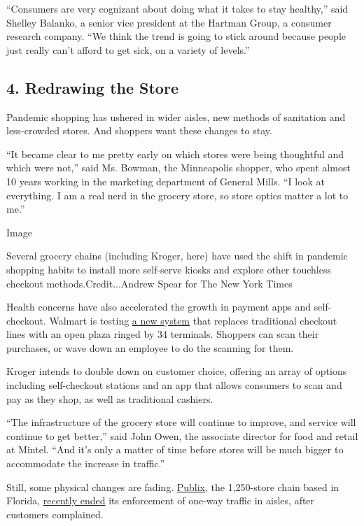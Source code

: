 ``Consumers are very cognizant about doing what it takes to stay
healthy,'' said Shelley Balanko, a senior vice president at the Hartman
Group, a consumer research company. ``We think the trend is going to
stick around because people just really can't afford to get sick, on a
variety of levels.''

\hypertarget{4-redrawing-the-store}{%
\subsection{4. Redrawing the Store}\label{4-redrawing-the-store}}

Pandemic shopping has ushered in wider aisles, new methods of sanitation
and less-crowded stores. And shoppers want these changes to stay.

``It became clear to me pretty early on which stores were being
thoughtful and which were not,'' said Ms. Bowman, the Minneapolis
shopper, who spent almost 10 years working in the marketing department
of General Mills. ``I look at everything. I am a real nerd in the
grocery store, so store optics matter a lot to me.''

Image

Several grocery chains (including Kroger, here) have used the shift in
pandemic shopping habits to install more self-serve kiosks and explore
other touchless checkout methods.Credit...Andrew Spear for The New York
Times

Health concerns have also accelerated the growth in payment apps and
self-checkout. Walmart is testing
\href{https://chainstoreage.com/first-look-walmarts-new-self-checkout-store}{a
new system} that replaces traditional checkout lines with an open plaza
ringed by 34 terminals. Shoppers can scan their purchases, or wave down
an employee to do the scanning for them.

Kroger intends to double down on customer choice, offering an array of
options including self-checkout stations and an app that allows
consumers to scan and pay as they shop, as well as traditional cashiers.

``The infrastructure of the grocery store will continue to improve, and
service will continue to get better,'' said John Owen, the associate
director for food and retail at Mintel. ``And it's only a matter of time
before stores will be much bigger to accommodate the increase in
traffic.''

Still, some physical changes are fading.
\href{https://www.publix.com/}{Publix}, the 1,250-store chain based in
Florida,
\href{https://www.orlandosentinel.com/coronavirus/jobs-economy/os-cfb-coronavirus-publix-one-way-aisles-20200831-hlxyyrt4fnhbfoc4hv5hgkkiki-story.html}{recently
ended} its enforcement of one-way traffic in aisles, after customers
complained.

